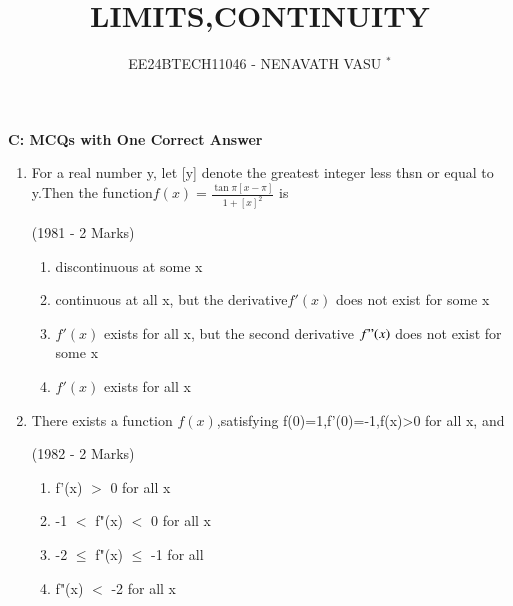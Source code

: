 \documentclass[journal,12pt,twocolumn]{IEEEtran}
\theoremstyle{remark}
\begin{document}

\vspace{3cm}

\title{LIMITS,CONTINUITY}
\author{EE24BTECH11046 - NENAVATH VASU $^{*}$%
}
\maketitle
\newpage
\bigskip

\renewcommand{\thefigure}{\theenumi}
\renewcommand{\thetable}{\theenumi}

\begin{flushleft}
\fontsize{18}{20}\selectfont
\textbf{C: MCQs with One Correct Answer}
\end{flushleft}


\begin{enumerate}[start=2]
   
\item For a real number y, let [y] denote the greatest integer less thsn or equal to y.Then the function{$f(x)=\frac{\tan\pi[x-\pi]}{1+[x]^2}$} is

\hfill                    (1981 - 2 Marks)
   \begin{enumerate}[label=(\alph*)] 
       \item discontinuous at some x
        \item continuous at all x, but the derivative$f'(x)$ does not exist for some x
        \item $f'(x)$ exists for all x, but the second derivative $f"(x)$ does not exist for some x
        \item $f'(x)$ exists for all x
   \end{enumerate}




\item There exists a function $f(x)$,satisfying f(0)=1,f'(0)=-1,f(x)>0 for all x, and 

\hfill      (1982 - 2 Marks)
    \begin{enumerate}[label=(\alph*)]

          \item f'(x) $>$ 0 for all x
          \item -1 $<$ f"(x) $<$ 0 for all x
          \item -2 $\leq$ f"(x) $\leq$ -1 for  all 
          \item f"(x) $<$ -2 for all x

          
          
           
    \end{enumerate}


\end{enumerate}
\end{document}
